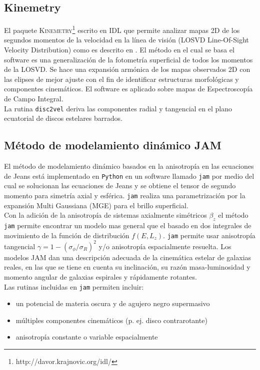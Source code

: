 \subsection{Kinemetry}

El paquete \textsc{Kinemetry}\footnote{http://davor.krajnovic.org/idl/} escrito en \textsc{IDL} que permite analizar mapas 2D de los segundos momentos de la velocidad en la línea de visión (LOSVD Line-Of-Sight Velocity Distribution) como es descrito en \cite{2006MNRAS.366..787K}. El método en el cual se basa el software es una generalización de la fotometría superficial de todos los momentos de la LOSVD. Se hace una expansión armónica de los mapas observados 2D con las elipses de mejor ajuste con el fin de identificar estructuras morfológicas y componentes cinemáticos. El software es aplicado sobre mapas de Espectroscopía de Campo Integral.\\

La rutina \verb+disc2vel+ deriva las componentes radial y tangencial en el plano ecuatorial de discos estelares barrados.


\subsection{Método de modelamiento dinámico JAM}

El método de modelamiento dinámico basados en la anisotropía en las ecuaciones de Jeans está implementado en \verb+Python+ en un software llamado \verb+jam+ por medio del cual se solucionan las ecuaciones de Jeans y se obtiene el tensor de segundo momento para simetría axial y esférica. \verb+jam+ realiza una parametrización por la expansión Multi Gaussiana (MGE) para el brillo superficial.\\

Con la adición de la anisotropía de sistemas axialmente simétricos $\beta_z$ el método \verb+jam+ permite encontrar un modelo mas general que el basado en dos integrales de movimiento de la función de distribución $f(E, L_z)$. \verb+jam+ permite usar anisotropía tangencial $\gamma = 1-(\sigma_{\phi}/\sigma_R)^2$ y/o anisotropía espacialmente resuelta. Los modelos JAM dan una descripción adecuada de la cinemática estelar de galaxias reales, en las que se tiene en cuenta su inclinación, su razón masa-luminosidad y momento angular de galaxias espirales y rápidamente rotantes.\\

Las rutinas incluidas en \verb+jam+ permiten incluir:
\begin{itemize}
\item un potencial de materia oscura y de agujero negro supermasivo
\item múltiples componentes cinemáticos (p. ej. disco contrarotante)
\item anisotropía constante o variable espacialmente
\end{itemize}

